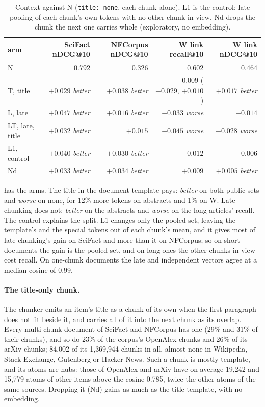 \documentclass[11pt]{article}
\theoremstyle{plain}
\theoremstyle{definition}
\theoremstyle{remark}
\newcommand{\code}[1]{\texttt{#1}}
\begin{document}
\begin{table}[t]
\centering\footnotesize
\caption{Context against N (\code{title: none}, each chunk alone). L1 is the control: late pooling
of each chunk's own tokens with no other chunk in view. Nd drops the chunk the next one carries
whole (exploratory, no embedding).}\label{tab:context}
\setlength{\tabcolsep}{3.5pt}
\begin{tabular}{lrrrr}
\toprule
arm & SciFact nDCG@10 & NFCorpus nDCG@10 & W link recall@10 & W link nDCG@10 \\
\midrule
N & 0.792 & 0.326 & 0.602 & 0.464 \\
T, title & $+0.029$ \emph{better} & $+0.038$ \emph{better} & $-0.009$ ($-0.029$, $+0.010$) & $+0.017$ \emph{better} \\
L, late & $+0.047$ \emph{better} & $+0.016$ \emph{better} & $-0.033$ \emph{worse} & $-0.014$ \\
LT, late, title & $+0.032$ \emph{better} & $+0.015$ & $-0.045$ \emph{worse} & $-0.028$ \emph{worse} \\
L1, control & $+0.040$ \emph{better} & $+0.030$ \emph{better} & $-0.012$ & $-0.006$ \\
Nd & $+0.033$ \emph{better} & $+0.034$ \emph{better} & $+0.009$ & $+0.005$ \emph{better} \\
\bottomrule
\end{tabular}
\end{table}

 has the arms. The title in the document template pays: \emph{better} on both
public sets and \emph{worse} on none, for 12\% more tokens on abstracts and 1\% on W. Late chunking
does not: \emph{better} on the abstracts and \emph{worse} on the long articles' recall. The control
explains the split. L1 changes only the pooled set, leaving the template's and the special tokens
out of each chunk's mean, and it gives most of late chunking's gain on SciFact and more than it on
NFCorpus; so on short documents the gain is the pooled set, and on long ones the other chunks in
view cost recall. On one-chunk documents the late and independent vectors agree at a median
cosine of 0.99.

\paragraph{The title-only chunk.} The chunker emits an item's title as a chunk of its own when the
first paragraph does not fit beside it, and carries all of it into the next chunk as its overlap.
Every multi-chunk document of SciFact and NFCorpus has one (29\% and 31\% of their chunks), and so
do 23\% of the corpus's OpenAlex chunks and 26\% of its arXiv chunks; 84{,}002 of its 1{,}369{,}944
chunks in all, almost none in Wikipedia, Stack Exchange, Gutenberg or Hacker News. Such a chunk is
mostly template, and its atoms are hubs: those of OpenAlex and arXiv have on average 19{,}242 and
15{,}779 atoms of other items above the cosine 0.785, twice the other atoms of the same sources.
Dropping it (Nd) gains as much as the title template, with no embedding.
\end{document}
